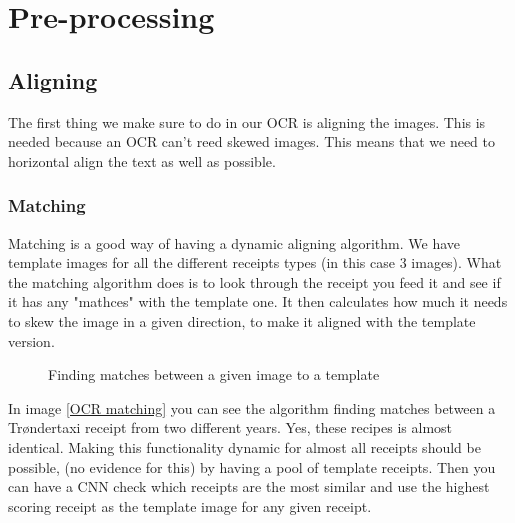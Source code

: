 \section{Pre-processing}\label{pre-processing}

\subsection{Aligning}\label{aligning}

The first thing we make sure to do in our OCR is aligning the images.
This is needed because an OCR can't reed skewed images.
This means that we need to horizontal align the text as well as possible.

\subsubsection[aligning]{Matching}

Matching is a good way of having a dynamic aligning algorithm.
We have template images for all the different receipts types (in this case 3 images).
What the matching algorithm does is to look through the receipt you feed it and see if it has any "mathces" with the template one.
It then calculates how much it needs to skew the image in a given direction, to make it aligned with the template version.

\begin{figure}[h]
    \caption{Finding matches between a given image to a template}
    \label{fig:OCR matching}
\end{figure}

In image \ref{OCR matching} you can see the algorithm finding matches between a Trøndertaxi receipt from two different years.
Yes, these recipes is almost identical.
Making this functionality dynamic for almost all receipts should be possible, (no evidence for this) by having a pool of template receipts.
Then you can have a CNN check which receipts are the most similar and use the highest scoring receipt as the template image for any given receipt.

